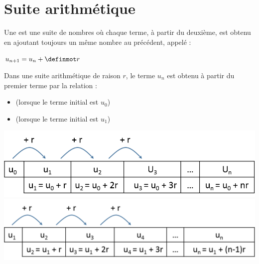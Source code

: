 \documentclass[12pt,a4paper]{article}
\date{}
\title{}
\begin{document}
{}

\section{Suite arithmétique}

\begin{mydef}
	Une  est une suite de nombres où chaque terme, à partir du deuxième, est obtenu en ajoutant toujours un même nombre au précédent, appelé  :
	
	\begin{center}
		$u_{n+1}=u_n + \kw{r}$
	\end{center} 
\end{mydef}

\begin{myprop}
	Dans une suite arithmétique de raison $r$, le terme $u_n$ est obtenu à partir du premier terme par la relation :
	\begin{itemize}
		\item {} (lorsque le terme initial est $u_0$) 
		\item {} (lorsque le terme initial est $u_1$)
	\end{itemize}
	
	\begin{multicols}{2}
		\includegraphics[scale=0.45]{./img/arith1}
		\includegraphics[scale=0.45]{./img/arith2}
	\end{multicols}
\end{myprop}



\end{document}
